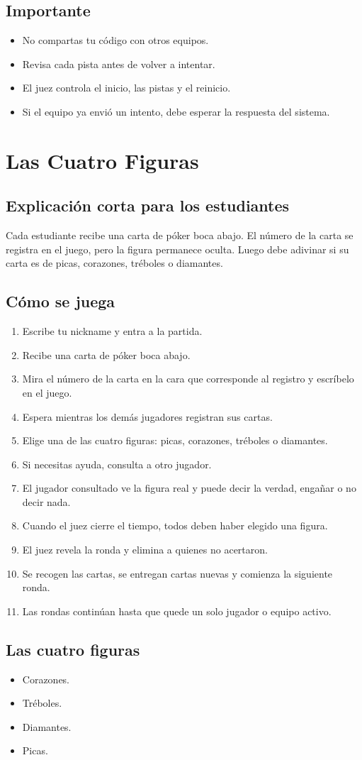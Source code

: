 \documentclass[12pt,a4paper]{article}
\newcommand{\juego}[1]{\section{#1}}
\newcommand{\subtitulo}[1]{\subsection*{#1}}
\begin{document}
\subtitulo{Importante}
\begin{itemize}
  \item No compartas tu código con otros equipos.
  \item Revisa cada pista antes de volver a intentar.
  \item El juez controla el inicio, las pistas y el reinicio.
  \item Si el equipo ya envió un intento, debe esperar la respuesta del sistema.
\end{itemize}

\juego{Las Cuatro Figuras}

\subtitulo{Explicación corta para los estudiantes}
\begin{tcolorbox}[colback=gris,colframe=rosado]
Cada estudiante recibe una carta de póker boca abajo. El número de la carta se registra en el juego, pero la figura permanece oculta. Luego debe adivinar si su carta es de picas, corazones, tréboles o diamantes.
\end{tcolorbox}

\subtitulo{Cómo se juega}
\begin{enumerate}
  \item Escribe tu nickname y entra a la partida.
  \item Recibe una carta de póker boca abajo.
  \item Mira el número de la carta en la cara que corresponde al registro y escríbelo en el juego.
  \item Espera mientras los demás jugadores registran sus cartas.
  \item Elige una de las cuatro figuras: picas, corazones, tréboles o diamantes.
  \item Si necesitas ayuda, consulta a otro jugador.
  \item El jugador consultado ve la figura real y puede decir la verdad, engañar o no decir nada.
  \item Cuando el juez cierre el tiempo, todos deben haber elegido una figura.
  \item El juez revela la ronda y elimina a quienes no acertaron.
  \item Se recogen las cartas, se entregan cartas nuevas y comienza la siguiente ronda.
  \item Las rondas continúan hasta que quede un solo jugador o equipo activo.
\end{enumerate}

\subtitulo{Las cuatro figuras}
\begin{itemize}
  \item Corazones.
  \item Tréboles.
  \item Diamantes.
  \item Picas.
\end{itemize}
\end{document}
